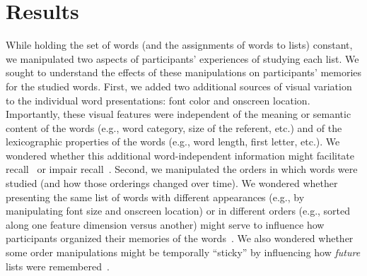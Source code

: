 \documentclass[11pt]{article}
\begin{document}
\section*{Results}

While holding the set of words (and the assignments of words to lists)
constant, we manipulated two aspects of participants' experiences of studying
each list. We sought to understand the effects of these manipulations on
participants' memories for the studied words. First, we added two additional
sources of visual variation to the individual word presentations: font color
and onscreen location. Importantly, these visual features were independent of
the meaning or semantic content of the words (e.g., word category, size of the
referent, etc.) and of the lexicographic properties of the words (e.g., word
length, first letter, etc.). We wondered whether this additional
word-independent information might facilitate recall~\citep[e.g., by providing
new or richer potential ways of organizing or retrieving memories of the
studied words;][]{HargEtal12, Mada21, MeinEtal20, DavaEtal03, SlamBarl79,
DrewMurd80, SochEtal09} or impair recall~\citep[e.g., by distracting or
confusing participants with irrelevant information][]{MarsEtal15, MarsEtal12,
Lang05, ReinEtal92}. Second, we manipulated the orders in which words were
studied (and how those orderings changed over time). We wondered whether
presenting the same list of words with different appearances (e.g., by
manipulating font size and onscreen location) or in different orders (e.g.,
sorted along one feature dimension versus another) might serve to influence how
participants organized their memories of the words~\citep[e.g., ][]{PolyKaha08,
MannEtal15}. We also wondered whether some order manipulations might be
temporally ``sticky'' by influencing how \textit{future} lists were
remembered~\citep[e.g., ][]{SiroEtal05, LohnEtal10, Whit27, Badd68,
DarlMurd71}.
\end{document}
